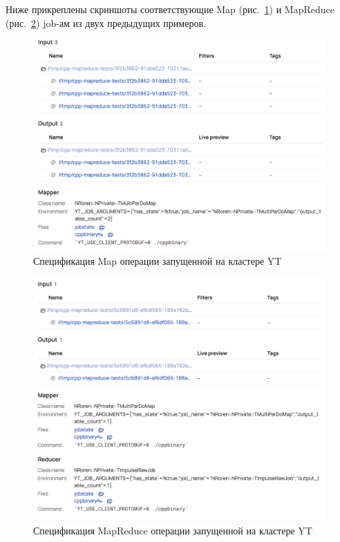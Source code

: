 Ниже прикреплены скриншоты соответствующие Map (рис.~\ref{fig:ytop}) и MapReduce (рис.~\ref{fig:mrytop}) job-ам из двух предыдущих примеров.

\begin{figure}[h]
    \centering
    \includegraphics[width=\textwidth]{img/ytop.png}
    \caption{Спецификация Map операции запущенной на кластере YT}
    \label{fig:ytop}
\end{figure}

\begin{figure}[h]
    \centering
    \includegraphics[width=\textwidth]{img/mrytop.png}
    \caption{Спецификация MapReduce операции запущенной на кластере YT}
    \label{fig:mrytop}
\end{figure}
